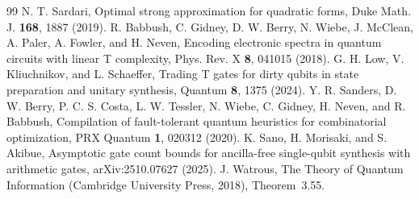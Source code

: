 \documentclass[aps,prx,twocolumn,superscriptaddress,nofootinbib,longbibliography]{revtex4-2}
\theoremstyle{plain}
\theoremstyle{definition}
\theoremstyle{remark}
\begin{document}
\begin{thebibliography}{99}
 N. T. Sardari, Optimal strong approximation for quadratic forms, Duke Math. J. \textbf{168}, 1887 (2019).
 R. Babbush, C. Gidney, D. W. Berry, N. Wiebe, J. McClean, A. Paler, A. Fowler, and H. Neven, Encoding electronic spectra in quantum circuits with linear T complexity, Phys. Rev. X \textbf{8}, 041015 (2018).
 G. H. Low, V. Kliuchnikov, and L. Schaeffer, Trading T gates for dirty qubits in state preparation and unitary synthesis, Quantum \textbf{8}, 1375 (2024).
 Y. R. Sanders, D. W. Berry, P. C. S. Costa, L. W. Tessler, N. Wiebe, C. Gidney, H. Neven, and R. Babbush, Compilation of fault-tolerant quantum heuristics for combinatorial optimization, PRX Quantum \textbf{1}, 020312 (2020).
 K. Sano, H. Morisaki, and S. Akibue, Asymptotic gate count bounds for ancilla-free single-qubit synthesis with arithmetic gates, arXiv:2510.07627 (2025).
 J. Watrous, The Theory of Quantum Information (Cambridge University Press, 2018), Theorem~3.55.
\end{thebibliography}
\end{document}
